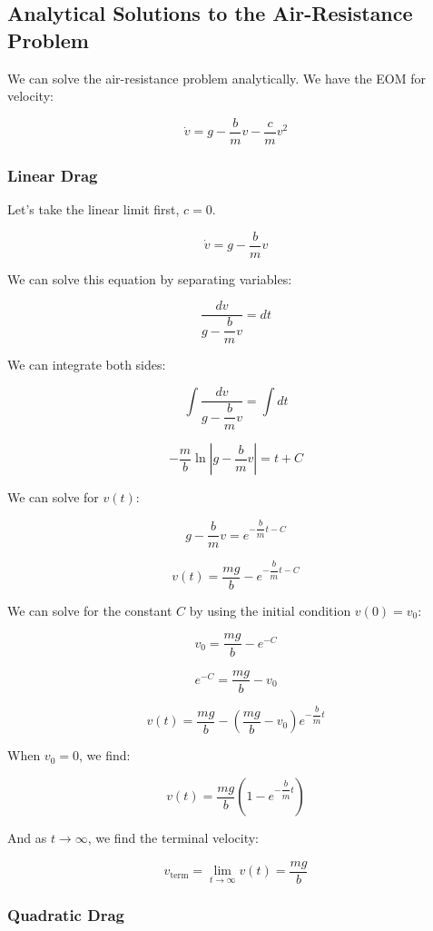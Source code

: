 \documentclass[11pt]{article}
\begin{document}
    \subsection{Analytical Solutions to the Air-Resistance
Problem}\label{analytical-solutions-to-the-air-resistance-problem}

We can solve the air-resistance problem analytically. We have the EOM
for velocity:

\[\dot{v} = g - \dfrac{b}{m}v - \dfrac{c}{m}v^2\]

\subsubsection{Linear Drag}\label{linear-drag}

Let's take the linear limit first, \(c=0\).

\[\dot{v} = g - \dfrac{b}{m}v\]

We can solve this equation by separating variables:

\[\dfrac{dv}{g - \dfrac{b}{m}v} = dt\]

We can integrate both sides:

\[\int \dfrac{dv}{g - \dfrac{b}{m}v} = \int dt\]

\[-\dfrac{m}{b} \ln|g - \dfrac{b}{m}v| = t + C\]

We can solve for \(v(t)\):

\[g - \dfrac{b}{m}v = e^{-\dfrac{b}{m}t - C}\]

\[v(t) = \dfrac{mg}{b} - e^{-\dfrac{b}{m}t - C}\]

We can solve for the constant \(C\) by using the initial condition
\(v(0) = v_0\):

\[v_0 = \dfrac{mg}{b} - e^{-C}\]

\[e^{-C} = \dfrac{mg}{b} - v_0\]

\[v(t) = \dfrac{mg}{b} - \left(\dfrac{mg}{b} - v_0\right)e^{-\dfrac{b}{m}t}\]

When \(v_0 = 0\), we find:

\[v(t) = \dfrac{mg}{b}\left(1 - e^{-\dfrac{b}{m}t}\right)\]

And as \(t \to \infty\), we find the terminal velocity:

\[v_{\text{term}} = \lim_{t \to \infty} v(t) = \dfrac{mg}{b}\]

    \subsubsection{Quadratic Drag}\label{quadratic-drag}
\end{document}
